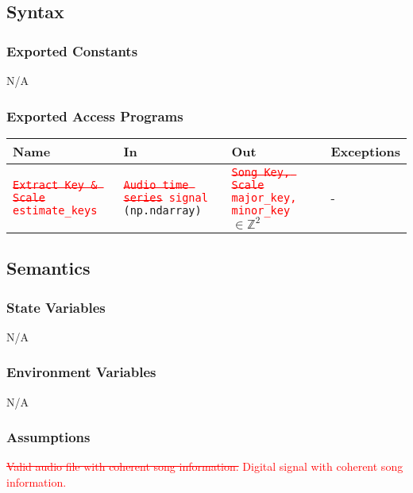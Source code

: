 \documentclass[12pt, titlepage]{article}
\begin{document}
\subsection{Syntax}

\subsubsection{Exported Constants}
N/A

\subsubsection{Exported Access Programs}

\begin{center}
\begin{tabular}{p{3cm} p{4cm} p{4cm} p{2cm}}
\hline
\textbf{Name} & \textbf{In} & \textbf{Out} & \textbf{Exceptions}\\
\hline%
\textcolor{red}{\st{\texttt{Extract Key \& Scale}}} \newline \textcolor{red}{\texttt{estimate\_keys}} &\texttt{\textcolor{red}{\st{Audio time series}} \newline \texttt{\textcolor{red}{signal}} (np.ndarray)} &\texttt{\textcolor{red}{\st{Song Key, Scale}} \newline \texttt{\textcolor{red}{major\_key, minor\_key}}} $\in \mathbb{Z}^2$ &-\\
\hline
\end{tabular}
\end{center}

\subsection{Semantics}

\subsubsection{State Variables}
N/A

\subsubsection{Environment Variables}
N/A

\subsubsection{Assumptions}
\textcolor{red}{\st{Valid audio file with coherent song information.}} \textcolor{red}{Digital signal with coherent song information.}
\end{document}
